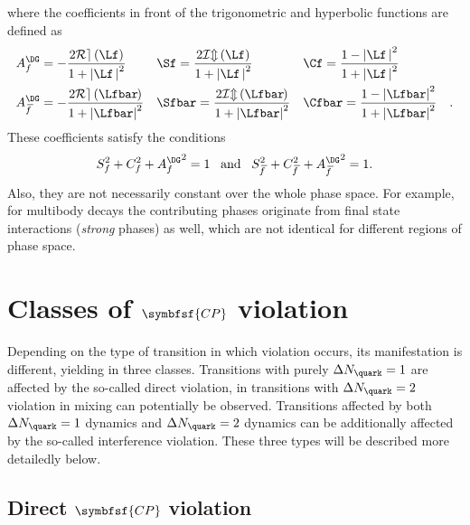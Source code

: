 where the coefficients in front of the trigonometric and hyperbolic functions are defined as
\begin{align}
&A_f^{\DG}=-\frac{2\mathcal{Re}\left(\Lf\right)}{1+\left|\Lf\,\right|^2}&
&\Sf=\frac{2\mathcal{Im}\left(\Lf\right)}{1+\left|\Lf\,\right|^2}&
&\Cf=\frac{1-\left|\Lf\,\right|^2}{1+\left|\Lf\,\right|^2}&\label{eq:cpcoeff}\\
&A_{\kern 1.5pt\overline{\kern -1.5pt f\kern 1.5pt}}^{\DG}=-\frac{2\mathcal{Re}\left(\Lfbar\kern -0.1em\right)}{1+\left|\Lfbar\right|^2}&
&\Sfbar=\frac{2\mathcal{Im}\left(\Lfbar\kern -0.1em\right)}{1+\left|\Lfbar\right|^2}&
&\Cfbar=\frac{1-\left|\Lfbar\right|^2}{1+\left|\Lfbar\right|^2}&\label{eq:cpcoeffbar}.
\end{align}
These coefficients satisfy the conditions
\begin{equation}
S_{f}^2+C_{f}^2+{A_f^{\DG}}^2=1\,\,\,\,\,\text{and}\,\,\,\,\,S_{\kern 1.5pt\overline{\kern -1.5pt f\kern 1.5pt}}^2+C_{\kern 1.5pt\overline{\kern -1.5pt f\kern 1.5pt}}^2+{A_{\kern 1.5pt\overline{\kern -1.5pt f\kern 1.5pt}}^{\DG}}^2=1.\label{eq:CpCoeffCond}
\end{equation}
Also, they are not necessarily constant over the whole phase space.
For example, for multibody decays the contributing phases originate from final state interactions (\ie \emph{strong} phases) as well, which are not identical for different regions of phase space.

\section[head={Classes of \CP violation},tocentry={Classes of \CP violation}]{Classes of $\symbfsf{C{}P}$ violation}
\label{sec:CPVClasses}

Depending on the type of transition in which \CP violation occurs, its manifestation is different, yielding in three classes.
Transitions with purely $\Delta N_\quark=1$ are affected by the so-called direct \CP violation, in transitions with $\Delta N_\quark=2$ \CP violation in mixing can potentially be observed.
Transitions affected by both $\Delta N_\quark=1$ dynamics and $\Delta N_\quark=2$ dynamics can be additionally affected by the so-called interference \CP violation.
These three types will be described more detailedly below.


\subsection[head={Direct \CP violation},tocentry={Direct \CP violation}]{Direct $\symbfsf{C{}P}$ violation}
\label{sec:DirectCPV}

